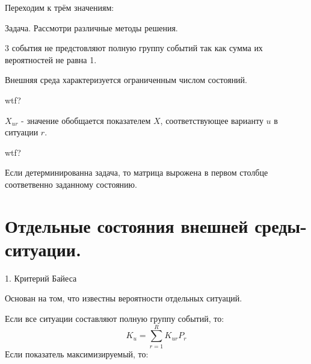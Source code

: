 \documentclass[12pt,a5paper]{scrbook}
\begin{document}
  Переходим к трём значениям:

  Задача. Рассмотри различные методы решения.

  3 события не предстовляют полную группу событий так как сумма их вероятностей не равна 1.

  Внешняя среда характеризуется ограниченным числом состояний.

  wtf?

  $X_{ur}$ - значение обобщается показателем $X$, соответствующее варианту $u$ в ситуации $r$.

  wtf?

  Если детерминированна задача, то матрица вырожена в первом столбце соответвенно заданному состоянию.

  \section{Отдельные состояния внешней среды-ситуации.}

  1. Критерий Байеса

  Основан на том, что известны вероятности отдельных ситуаций.

  Если все ситуации составляют полную группу событий, то:
  $$K_u = \sum_{r=1}^RK_{ur}P_r$$
  Если показатель максимизируемый, то:

\end{document}
